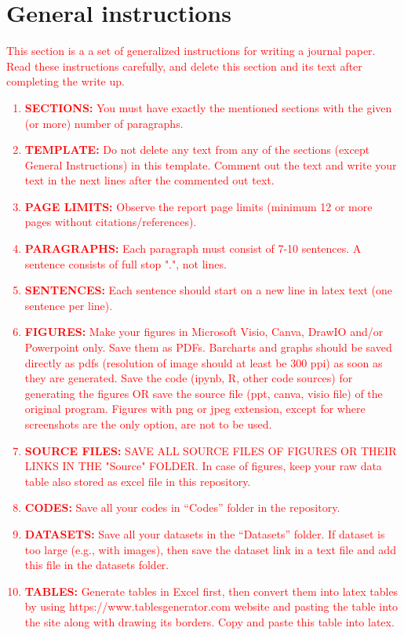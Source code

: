 \documentclass[conference]{IEEEtran}
\begin{document}
\section{General instructions}
\textcolor{red}{This section is a a set of generalized instructions for writing a journal paper.
Read these instructions carefully, and delete this section and its text after completing the write up.
\begin{enumerate}
    \item \textbf{SECTIONS:} You must have exactly the mentioned sections with the given (or more) number of paragraphs.
    \item \textbf{TEMPLATE:} Do not delete any text from any of the sections (except General Instructions) in this template. Comment out the text and write your text in the next lines after the commented out text. 
    \item \textbf{PAGE LIMITS:} Observe the report page limits (minimum 12 or more pages without citations/references). 
    \item \textbf{PARAGRAPHS:} Each paragraph must consist of 7-10 sentences. A sentence consists of full stop ".", not lines.
    \item \textbf{SENTENCES:} Each sentence should start on a new line in latex text (one sentence per line). 
    \item \textbf{FIGURES:} Make your figures in Microsoft Visio, Canva, DrawIO and/or Powerpoint only. Save them as PDFs. Barcharts and graphs should be saved directly as pdfs (resolution of image should at least be 300 ppi) as soon as they are generated. Save the code (ipynb, R, other code sources) for generating the figures OR save the source file (ppt, canva, visio file) of the original program. Figures with png or jpeg extension, except for where screenshots are the only option, are not to be used.  
    \item \textbf{SOURCE FILES:} SAVE ALL SOURCE FILES OF FIGURES OR THEIR LINKS IN THE "Source" FOLDER. In case of figures, keep your raw data table also stored as excel file in this repository.
    \item \textbf{CODES:} Save all your codes in ``Codes'' folder in the repository.
    \item \textbf{DATASETS:} Save all your datasets in the ``Datasets'' folder. If dataset is too large (e.g., with images), then save the dataset link in a text file and add this file in the datasets folder.
    \item \textbf{TABLES:} Generate tables in Excel first, then convert them into latex tables by using https://www.tablesgenerator.com website and pasting the table into the site along with drawing its borders. Copy and paste this table into latex.

\end{enumerate}}
\end{document}
